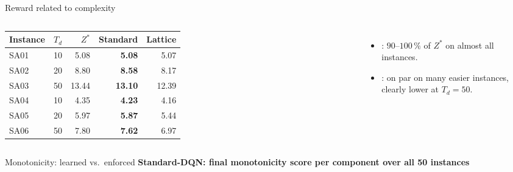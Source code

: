 \documentclass[aspectratio=169, 11pt]{beamer}
\begin{document}
\begin{frame}{Reward related to complexity}
  \begin{columns}[c]
      \centering
      \small
      \begin{tabular}{l r r r r}
        \toprule
        Instance & $T_d$ & $Z^*$ & Standard & Lattice \\
        \midrule
        SA01 & 10 & 5.08  & \textbf{5.08}  & 5.07 \\
        SA02 & 20 & 8.80  & \textbf{8.58}  & 8.17 \\
        SA03 & 50 & 13.44 & \textbf{13.10} & 12.39 \\
        \addlinespace
        SA04 & 10 & 4.35  & \textbf{4.23}  & 4.16 \\
        SA05 & 20 & 5.97  & \textbf{5.87}  & 5.44 \\
        SA06 & 50 & 7.80  & \textbf{7.62}  & 6.97 \\
        \bottomrule
      \end{tabular}

      \medskip
      \begin{itemize}
        \item \Std: $90$--$100\,\%$ of $Z^*$ on almost all instances.
        \item \Lat: on par on many easier instances, clearly lower at $T_d=50$.
      \end{itemize}
  \end{columns}
\end{frame}

\begin{frame}{Monotonicity: learned vs.\ enforced}
  \centering
  \textbf{\small Standard-DQN: final monotonicity score per component over all 50 instances}\\[2pt]
\end{frame}
\end{document}
